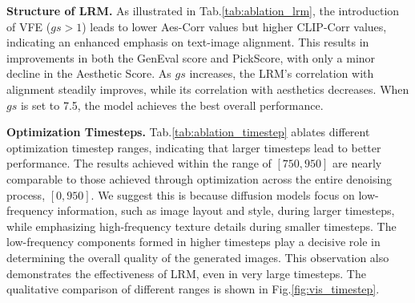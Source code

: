\begin{table}[t]
    \centering
    \vspace{-2mm}
    \caption{Ablation results on different threshold strategies.}
    \vskip 0.05in
    \label{tab:ablation_threshold}
    \scriptsize
    \vskip -0.1in
\end{table}


\textbf{Structure of LRM.} As illustrated in Tab.\;\ref{tab:ablation_lrm}, the introduction of VFE ($gs>1$) leads to lower Aes-Corr values but higher CLIP-Corr values, indicating an enhanced emphasis on text-image alignment. This results in improvements in both the GenEval score and PickScore, with only a minor decline in the Aesthetic Score. As $gs$ increases, the LRM's correlation with alignment steadily improves, while its correlation with aesthetics decreases. When $gs$ is set to 7.5, the model achieves the best overall performance.

\textbf{Optimization Timesteps.} Tab.\;\ref{tab:ablation_timestep} ablates different optimization timestep ranges, indicating that larger timesteps lead to better performance. The results achieved within the range of $[750, 950]$ are nearly comparable to those achieved through optimization across the entire denoising process, \ie $[0,950]$. We suggest this is because diffusion models focus on low-frequency information, such as image layout and style, during larger timesteps, while emphasizing high-frequency texture details during smaller timesteps. The low-frequency components formed in higher timesteps play a decisive role in determining the overall quality of the generated images. This observation also demonstrates the effectiveness of LRM, even in very large timesteps. The qualitative comparison of different ranges is shown in Fig.\;\ref{fig:vis_timestep}.

